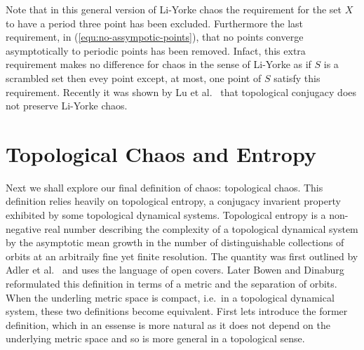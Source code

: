 Note that in this general version of Li-Yorke chaos the requirement for the set $X$ to have a period three point has been excluded. Furthermore the last requirement, in (\ref{equ:no-assympotic-points}), that no points converge asymptotically to periodic points has been removed. Infact, this extra requirement makes no difference for chaos in the sense of Li-Yorke as if $S$ is a scrambled set then evey point except, at most, one point of $S$ satisfy this requirement. Recently it was shown by Lu et al.\ \cite{lu-zhu-wu} that topological conjugacy does not preserve Li-Yorke chaos.

\section{Topological Chaos and Entropy} \label{sec:topological-chaos}
Next we shall explore our final definition of chaos: topological chaos. This definition relies heavily on topological entropy, a conjugacy invarient property exhibited by some topological dynamical systems. Topological entropy is a non-negative real number describing the complexity of a topological dynamical system by the asymptotic mean growth in the number of distinguishable collections of orbits at an arbitraily fine yet finite resolution. The quantity was first outlined by Adler et al.\ \cite{adler} and uses the language of open covers. Later Bowen \cite{bowen} and Dinaburg \cite{dinaburg} reformulated this definition in terms of a metric and the separation of orbits. When the underling metric space is compact, i.e.\ in a topological dynamical system, these two definitions become equivalent. First lets introduce the former definition, which in an essense is more natural as it does not depend on the underlying metric space and so is more general in a topological sense.


